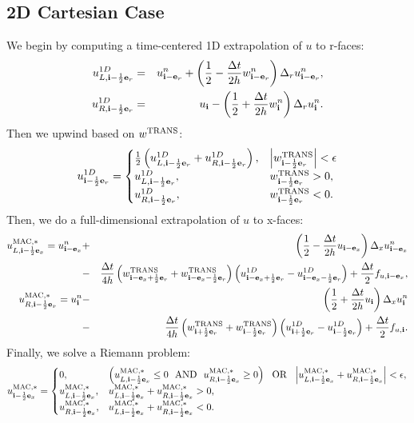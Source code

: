 \documentclass[11pt]{article}
\def\half  {\frac{1}{2}}
\def\dt    {\Delta t}
\def\mac   {\rm MAC}
\def\trans {\rm TRANS}
\def\eb    {{\bf e}}
\def\ib    {{\bf i}}
\begin{document}
\subsection{2D Cartesian Case}
We begin by computing a time-centered 1D extrapolation of $u$ to r-faces:
\begin{eqnarray}
u_{L,\ib-\half\eb_r}^{1D} &=& u_{\ib-\eb_r}^n + \left(\half - \frac{\dt}{2h}w_{\ib-\eb_r}^n\right)\Delta_r u_{\ib-\eb_r}^n, \\
u_{R,\ib-\half\eb_r}^{1D} &=& u_{\ib} - \left(\half + \frac{\dt}{2h}w_{\ib}^n\right)\Delta_r u_{\ib}^n.
\end{eqnarray}
Then we upwind based on $w^{\trans}$:
\begin{equation}
u_{\ib-\half\eb_r}^{1D} =
\begin{cases}
\half\left(u_{L,\ib-\half\eb_r}^{1D} + u_{R,\ib-\half\eb_r}^{1D}\right), & \left|w^{\trans}_{\ib-\half\eb_r}\right| < \epsilon \\
u_{L,\ib-\half\eb_r}^{1D}, & w^{\trans}_{\ib-\half\eb_r} > 0, \\
u_{R,\ib-\half\eb_r}^{1D}, & w^{\trans}_{\ib-\half\eb_r} < 0. \\
\end{cases}
\end{equation}
Then, we do a full-dimensional extrapolation of $u$ to x-faces:
\begin{eqnarray}
u_{L,\ib-\half\eb_x}^{\mac,*} = u_{\ib-\eb_x}^n &+& \left(\half - \frac{\dt}{2h}u_{\ib-\eb_x}\right)\Delta_x u_{\ib-\eb_x}^n \nonumber \\
&-& \frac{\dt}{4h}\left(w_{\ib-\eb_x+\half\eb_r}^{\trans}+w_{\ib-\eb_x-\half\eb_r}^{\trans}\right)\left(u_{\ib-\eb_x+\half\eb_r}^{1D} - u_{\ib-\eb_x-\half\eb_r}^{1D}\right) + \frac{\dt}{2}f_{u,\ib-\eb_x}, \\
u_{R,\ib-\half\eb_x}^{\mac,*} = u_{\ib}^n &-& \left(\half + \frac{\dt}{2h}u_{\ib}\right)\Delta_x u_{\ib}^n \nonumber \\
&-& \frac{\dt}{4h}\left(w_{\ib+\half\eb_r}^{\trans}+w_{\ib-\half\eb_r}^{\trans}\right)\left(u_{\ib+\half\eb_r}^{1D} - u_{\ib-\half\eb_r}^{1D}\right) + \frac{\dt}{2}f_{u,\ib}.
\end{eqnarray}
Finally, we solve a Riemann problem:
\begin{equation}
u_{\ib-\half\eb_x}^{\mac,*} =
\begin{cases}
0, & \left(u_{L,\ib-\half\eb_x}^{\mac,*} \le 0 ~~ {\rm AND} ~~ u_{R,\ib-\half\eb_x}^{\mac,*} \ge 0\right) ~~ {\rm OR} ~~ \left|u_{L,\ib-\half\eb_x}^{\mac,*} + u_{R,\ib-\half\eb_x}^{\mac,*}\right| < \epsilon, \\
u_{L,\ib-\half\eb_x}^{\mac,*}, & u_{L,\ib-\half\eb_x}^{\mac,*} + u_{R,\ib-\half\eb_x}^{\mac,*} > 0, \\
u_{R,\ib-\half\eb_x}^{\mac,*}, & u_{L,\ib-\half\eb_x}^{\mac,*} + u_{R,\ib-\half\eb_x}^{\mac,*} < 0. 
\end{cases}
\end{equation}
\end{document}
